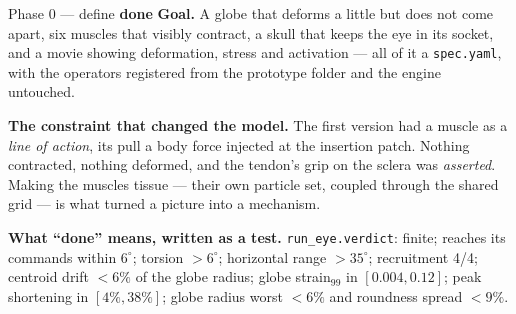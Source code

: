 \documentclass[11pt,a4paper]{article}
\newcommand{\code}[1]{\texttt{#1}}
\newcommand{\dn}{\textcolor{good}{\textbf{done}}}
\begin{document}
\begin{phasebox}{Phase 0 --- define \hfill \dn}
\textbf{Goal.} A globe that deforms a little but does not come apart, six muscles that visibly
contract, a skull that keeps the eye in its socket, and a movie showing deformation, stress and
activation --- all of it a \code{spec.yaml}, with the operators registered from the prototype
folder and the engine untouched.

\textbf{The constraint that changed the model.} The first version had a muscle as a \emph{line of
action}, its pull a body force injected at the insertion patch. Nothing contracted, nothing
deformed, and the tendon's grip on the sclera was \emph{asserted}. Making the muscles tissue ---
their own particle set, coupled through the shared grid --- is what turned a picture into a
mechanism.

\textbf{What ``done'' means, written as a test.} \code{run\_eye.verdict}: finite; reaches its
commands within $6^\circ$; torsion $>6^\circ$; horizontal range $>35^\circ$; recruitment 4/4;
centroid drift $<6\%$ of the globe radius; globe strain$_{99}$ in $[0.004, 0.12]$; peak shortening
in $[4\%, 38\%]$; globe radius worst $<6\%$ and roundness spread $<9\%$.
\end{phasebox}
\end{document}

